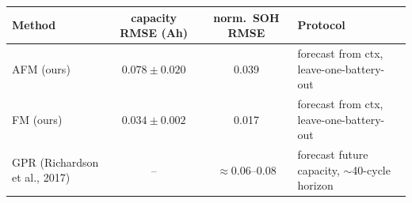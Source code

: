\begin{tabular}{lccl}
\toprule
Method & capacity RMSE (Ah) & norm.\ SOH RMSE & Protocol \\
\midrule
AFM (ours) & $0.078\!\pm\!0.020$ & 0.039 & forecast from ctx, leave-one-battery-out \\
FM (ours) & $0.034\!\pm\!0.002$ & 0.017 & forecast from ctx, leave-one-battery-out \\
GPR (Richardson et al., 2017) & -- & $\approx$0.06--0.08 & forecast future capacity, $\sim$40-cycle horizon \\
\bottomrule
\end{tabular}